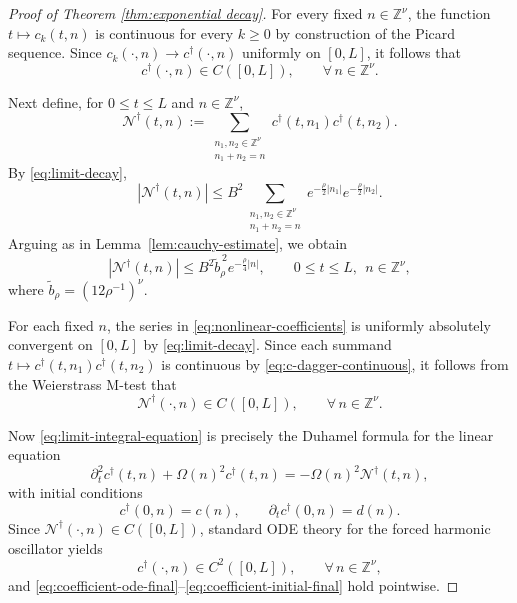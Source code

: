 \documentclass[12pt,reqno,tbtags]{amsart}
\newcommand\1{\mathbbm{1}}
\begin{document}
\begin{proof}[Proof of Theorem \ref{thm:exponential decay}]
For every fixed $n\in \mathbb{Z}^{\nu}$, the function $t\mapsto c_k(t,n)$ is continuous
for every $k\geq 0$ by construction of the Picard sequence. Since
$c_k(\cdot,n)\to c^{\dagger}(\cdot,n)$ uniformly on $[0,L]$, it follows that
\begin{equation}\label{eq:c-dagger-continuous}
c^{\dagger}(\cdot,n)\in C([0,L]),
\qquad \forall\, n\in \mathbb{Z}^{\nu}.
\end{equation}

Next define, for $0\leq t\leq L$ and $n\in \mathbb{Z}^{\nu}$,
\begin{equation}\label{eq:nonlinear-coefficients}
\mathcal{N}^{\dagger}(t,n)
:=
\sum_{\substack{n_1,n_2\in \mathbb{Z}^{\nu}\\ n_1+n_2=n}}
c^{\dagger}(t,n_1)c^{\dagger}(t,n_2).
\end{equation}
By \eqref{eq:limit-decay},
\[
|\mathcal{N}^{\dagger}(t,n)|
\leq
B^2
\sum_{\substack{n_1,n_2\in \mathbb{Z}^{\nu}\\ n_1+n_2=n}}
e^{-\frac{\rho}{2}|n_1|}e^{-\frac{\rho}{2}|n_2|}.
\]
Arguing as in Lemma~\ref{lem:cauchy-estimate}, we obtain
\begin{equation}\label{eq:N-dagger-decay}
|\mathcal{N}^{\dagger}(t,n)|
\leq
B^2 \widetilde b_{\rho}^{\,2} e^{-\frac{\rho}{4}|n|},
\qquad
0\leq t\leq L,\ \ n\in \mathbb{Z}^{\nu},
\end{equation}
where $\widetilde b_{\rho}=(12\rho^{-1})^{\nu}$.

For each fixed $n$, the series in \eqref{eq:nonlinear-coefficients} is uniformly
absolutely convergent on $[0,L]$ by \eqref{eq:limit-decay}. Since each summand
$t\mapsto c^{\dagger}(t,n_1)c^{\dagger}(t,n_2)$ is continuous by
\eqref{eq:c-dagger-continuous}, it follows from the Weierstrass M-test that
\begin{equation*}
\mathcal{N}^{\dagger}(\cdot,n)\in C([0,L]),
\qquad \forall\, n\in \mathbb{Z}^{\nu}.
\end{equation*}

Now \eqref{eq:limit-integral-equation} is precisely the Duhamel formula for the linear
equation
\begin{equation}\label{eq:coefficient-ode-final}
\partial_t^2 c^{\dagger}(t,n)
+\Omega(n)^2 c^{\dagger}(t,n)
=
-\Omega(n)^2 \mathcal{N}^{\dagger}(t,n),
\end{equation}
with initial conditions
\begin{equation}\label{eq:coefficient-initial-final}
c^{\dagger}(0,n)=c(n),
\qquad
\partial_t c^{\dagger}(0,n)=d(n).
\end{equation}
Since $\mathcal{N}^{\dagger}(\cdot,n)\in C([0,L])$, standard ODE theory for the forced
harmonic oscillator yields
\begin{equation*}
c^{\dagger}(\cdot,n)\in C^2([0,L]),
\qquad \forall\, n\in \mathbb{Z}^{\nu},
\end{equation*}
and \eqref{eq:coefficient-ode-final}--\eqref{eq:coefficient-initial-final} hold pointwise.


\end{proof}
\end{document}

